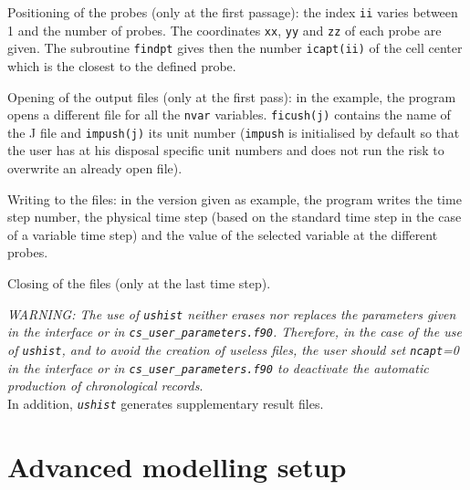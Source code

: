{{\begin{list}{-}{}
\item Positioning of the probes (only at the first passage): the index
      \texttt{ii} varies between 1 and the number of probes. The coordinates
      \texttt{xx}, \texttt{yy} and \texttt{zz} of each probe are given.
      The subroutine \texttt{findpt}
      gives then the number \texttt{icapt(ii)} of the cell center
      which is the closest to the defined probe.

\item Opening of the output files (only at the first pass): in the
      example, the program opens a different file for
      all the \texttt{nvar} variables. \texttt{ficush(j)} contains the name of the
      J\raisebox{1ex}{\small th} file and \texttt{impush(j)} its unit number
      (\texttt{impush} is initialised by default so that the user has at his
      disposal specific unit numbers and does not run the risk to overwrite an
      already open file).

\item Writing to the files: in the version given as example, the program
      writes the time step number, the physical time step (based on the
      standard time step in the case of a variable time step) and the
      value of the selected variable at the different probes.

\item Closing of the files (only at the last time step).

\end{list}

{\em WARNING: The use of {\em\texttt{ushist}} neither erases nor replaces the
parameters given in the interface or in {\em\texttt{cs\_user\_parameters.f90}}. Therefore, in
the case of the use of {\em\texttt{ushist}}, and to avoid the creation
of useless files, the user should set {\em \texttt{ncapt}=0} in the interface or
in {\em \texttt{cs\_user\_parameters.f90}} to deactivate the automatic production of
chronological records}.\\
In addition, {\em \texttt{ushist}} generates supplementary result
files.


\section{Advanced modelling setup}

}}
